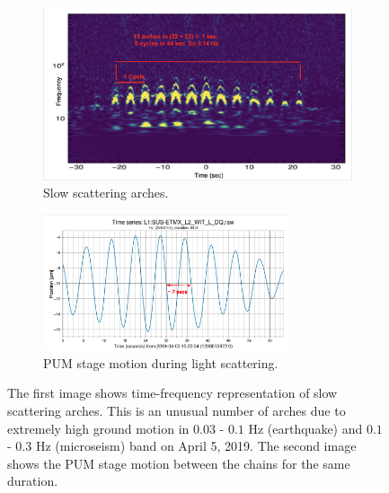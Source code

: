 \documentclass[12pt]{iopart}
\begin{document}
\begin{figure}[h]
\captionsetup[subfigure]{font=scriptsize,labelfont=scriptsize}
   \centering
    \begin{subfigure}[b]{0.45\textwidth}
        \centering
         \includegraphics[width= \textwidth]{slowarch.png}
         \caption{Slow scattering arches.}
         \label{fig:slowscat}
    \end{subfigure}
    \hfill
    \begin{subfigure}[b]{0.5\textwidth}
        \centering
         \includegraphics[width =\textwidth,height=4cm]{tssus1.png}
         \caption{PUM stage motion during light scattering.}
         \label{fig:timeseriessus}
         
    
    \end{subfigure}
    \caption{The first image shows time-frequency representation of  slow scattering arches. This is an unusual number of arches due to extremely high ground motion in  $0.03$ - $0.1$ Hz (earthquake) and $0.1$ - $0.3$  Hz (microseism) band on April 5, 2019. The second image shows the PUM stage motion between the chains for the same duration.}
    \label{fig:slowscat_sus}
    
\end{figure}
\end{document}
